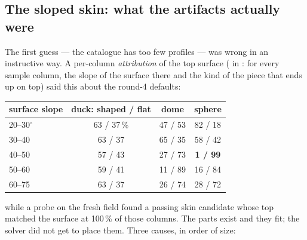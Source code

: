 \subsection{The sloped skin: what the artifacts actually were}
The first guess --- the catalogue has too few profiles --- was wrong in an instructive way. A per-column \emph{attribution} of the
top surface ( in : for every sample column, the slope of the surface there and the kind of the
piece that ends up on top) said this about the round-4 defaults:
\begin{center}\small
\begin{tabular}{lccc}
\toprule
surface slope & duck: shaped / flat & dome & sphere \\
\midrule
20--30$^\circ$ & 63 / 37\,\% & 47 / 53 & 82 / 18 \\
30--40 & 63 / 37 & 65 / 35 & 58 / 42 \\
40--50 & 57 / 43 & 27 / 73 & \textbf{1 / 99} \\
50--60 & 59 / 41 & 11 / 89 & 16 / 84 \\
60--75 & 63 / 37 & 26 / 74 & 28 / 72 \\
\bottomrule
\end{tabular}
\end{center}
while a probe on the fresh field found a passing skin candidate whose top matched the surface at 100\,\% of those columns. The
parts exist and they fit; the solver did not get to place them. Three causes, in order of size:
